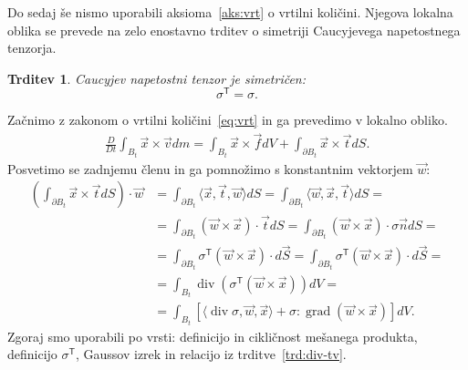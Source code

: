 \documentclass[a4paper,twoside]{article}
\theoremstyle{definition} %
\theoremstyle{plain} %
\newtheorem{trditev}[definicija]{Trditev}
\numberwithin{equation}{section}
\newcommand{\T}{\mathsf{T}}
\renewcommand{\div}{\operatorname{div}}
\newcommand{\grad}{\operatorname{grad}}
\newcommand{\DD}[2]{\ensuremath{\frac{D #1}{D #2}}}
\newcommand{\DDt}[1]{\DD{#1}{t}}
\newcommand{\vv}{\vec{v}}
\newcommand{\vt}{\vec{t}}
\newcommand{\vw}{\vec{w}}
\newcommand{\vn}{\vec{n}}
\newcommand{\vf}{\vec{f}}
\newcommand{\vx}{\vec{x}}
\newcommand{\ts}{\sigma}
\begin{document}
Do sedaj še nismo uporabili aksioma~\ref{aks:vrt} o vrtilni količini.
Njegova lokalna oblika se prevede na zelo enostavno trditev o simetriji
Caucyjevega napetostnega tenzorja.
\begin{trditev}
  \label{trd:sigma-symmetric}
  Caucyjev napetostni tenzor je simetričen:
  \[ \ts^\T = \ts. \]
\end{trditev}
\proof
Začnimo z zakonom o vrtilni količini~\eqref{eq:vrt} in ga prevedimo v lokalno
obliko.
\begin{align*}
  \DDt{}\int_{B_t}\vx \times \vv dm = \int_{B_t} \vx \times \vf dV +
  \int_{\partial B_t} \vx\times\vt dS.
\end{align*}
Posvetimo se zadnjemu členu in ga pomnožimo s konstantnim vektorjem $\vw$:
\begin{align*}
\left(\int_{\partial B_t} \vx \times \vt dS\right)\cdot \vw  &=
  \int_{\partial B_t} \langle \vx, \vt, \vw \rangle dS =
  \int_{\partial B_t} \langle \vw, \vx, \vt \rangle dS = \\ &=
  \int_{\partial B_t} (\vw \times \vx) \cdot \vt dS =
  \int_{\partial B_t} (\vw \times \vx) \cdot \ts\vn dS = \\ &=
  \int_{\partial B_t} \ts^\T(\vw \times \vx) \cdot d\vec{S} =
  \int_{\partial B_t} \ts^\T(\vw \times \vx) \cdot d\vec{S} = \\ &=
  \int_{B_t} \div (\ts^\T(\vw \times \vx)) dV = \\ &=
\int_{B_t} [\langle \div \ts, \vw, \vx\rangle +  \ts : \grad (\vw \times \vx)] dV.
\end{align*}
Zgoraj smo uporabili po vrsti: definicijo in cikličnost mešanega produkta, definicijo
$\ts^\T$, Gaussov izrek in relacijo iz trditve~\ref{trd:div-tv}.
\end{document}
